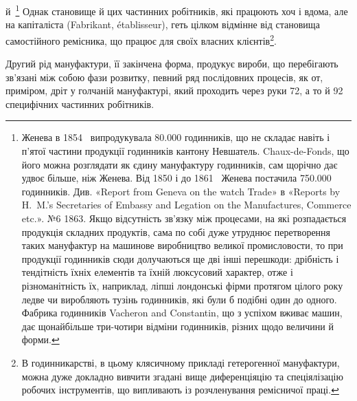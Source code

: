 й~\footnote{
Женева в 1854~ випродукувала \num{80.000} годинників, що не складає
навіть і п’ятої частини продукції годинників кантону Невшатель.
Chaux-de-Fonds, що його можна розглядати як єдину мануфактуру годинників,
сам щорічно дає удвоє більше, ніж Женева. Від 1850 і до 1861~
Женева постачила \num{750.000} годинників. Див. «Report from Geneva on
the watch Trade» в «Reports by H.~M.’s Secretaries of Embassy and Legation
on the Manufactures, Commerce etc.». №6 1863. Якщо відсутність
зв’язку між процесами, на які розпадається продукція складних продуктів, сама по собі дуже утруднює перетворення таких мануфактур на
машинове виробництво великої промисловости, то при продукції годинників
сюди долучаються ще дві інші перешкоди: дрібність і тендітність
їхніх елементів та їхній люксусовий характер, отже і різноманітність їх,
наприклад, ліпші лондонські фірми протягом цілого року ледве чи виробляють
тузінь годинників, які були б подібні один до одного. Фабрика
годинників Vacheron and Constantin, що з успіхом вживає машин,
дає щонайбільше три-чотири відміни годинників, різних щодо величини
й форми.
} Однак становище й цих частинних робітників, які працюють
хоч і вдома, але на капіталіста (Fabrikant, établisseur),
геть цілком відмінне від становища самостійного ремісника, що
працює для своїх власних клієнтів\footnote{
В годинникарстві, в цьому клясичному прикладі гетерогенної
мануфактури, можна дуже докладно вивчити згадані вище диференціяцію
та спеціялізацію робочих інструментів, що випливають із розчленування
ремісничої праці.
}.

Другий рід мануфактури, її закінчена форма, продукує
вироби, що перебігають зв’язані між собою фази розвитку, певний
ряд послідовних процесів, як от, приміром, дріт у голчаній
мануфактурі, який проходить через руки 72, а то й 92 специфічних
частинних робітників.

